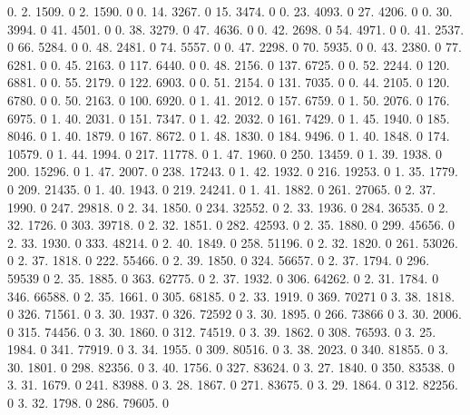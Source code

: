0. 2. 1509. 0 2. 1590. 0 0. 14. 3267. 0 15. 3474. 0 0. 23. 4093. 0 27. 4206. 0 0. 30. 3994. 0 41. 4501. 0 0. 38. 3279. 0 47. 4636. 0 0. 42. 2698. 0 54. 4971. 0 0. 41. 2537. 0 66. 5284. 0 0. 48. 2481. 0 74. 5557. 0 0. 47. 2298. 0 70. 5935. 0 0. 43. 2380. 0 77. 6281. 0 0. 45. 2163. 0 117. 6440. 0 0. 48. 2156. 0 137. 6725. 0 0. 52. 2244. 0 120. 6881. 0 0. 55. 2179. 0 122. 6903. 0 0. 51. 2154. 0 131. 7035. 0 0. 44. 2105. 0 120. 6780. 0 0. 50. 2163. 0 100. 6920. 0 1. 41. 2012. 0 157. 6759. 0 1. 50. 2076. 0 176. 6975. 0 1. 40. 2031. 0 151. 7347. 0 1. 42. 2032. 0 161. 7429. 0 1. 45. 1940. 0 185. 8046. 0 1. 40. 1879. 0 167. 8672. 0 1. 48. 1830. 0 184. 9496. 0 1. 40. 1848. 0 174. 10579. 0 1. 44. 1994. 0 217. 11778. 0 1. 47. 1960. 0 250. 13459. 0 1. 39. 1938. 0 200. 15296. 0 1. 47. 2007. 0 238. 17243. 0 1. 42. 1932. 0 216. 19253. 0 1. 35. 1779. 0 209. 21435. 0 1. 40. 1943. 0 219. 24241. 0 1. 41. 1882. 0 261. 27065. 0 2. 37. 1990. 0 247. 29818. 0 2. 34. 1850. 0 234. 32552. 0 2. 33. 1936. 0 284. 36535. 0 2. 32. 1726. 0 303. 39718. 0 2. 32. 1851. 0 282. 42593. 0 2. 35. 1880. 0 299. 45656. 0 2. 33. 1930. 0 333. 48214. 0 2. 40. 1849. 0 258. 51196. 0 2. 32. 1820. 0 261. 53026. 0 2. 37. 1818. 0 222. 55466. 0 2. 39. 1850. 0 324. 56657. 0 2. 37. 1794. 0 296. 59539 0 2. 35. 1885. 0 363. 62775. 0 2. 37. 1932. 0 306. 64262. 0 2. 31. 1784. 0 346. 66588. 0 2. 35. 1661. 0 305. 68185. 0 2. 33. 1919. 0 369. 70271 0 3. 38. 1818. 0 326. 71561. 0 3. 30. 1937. 0 326. 72592 0 3. 30. 1895. 0 266. 73866 0 3. 30. 2006. 0 315. 74456. 0 3. 30. 1860. 0 312. 74519. 0 3. 39. 1862. 0 308. 76593. 0 3. 25. 1984. 0 341. 77919. 0 3. 34. 1955. 0 309. 80516. 0 3. 38. 2023. 0 340. 81855. 0 3. 30. 1801. 0 298. 82356. 0 3. 40. 1756. 0 327. 83624. 0 3. 27. 1840. 0 350. 83538. 0 3. 31. 1679. 0 241. 83988. 0 3. 28. 1867. 0 271. 83675. 0 3. 29. 1864. 0 312. 82256. 0 3. 32. 1798. 0 286. 79605. 0 